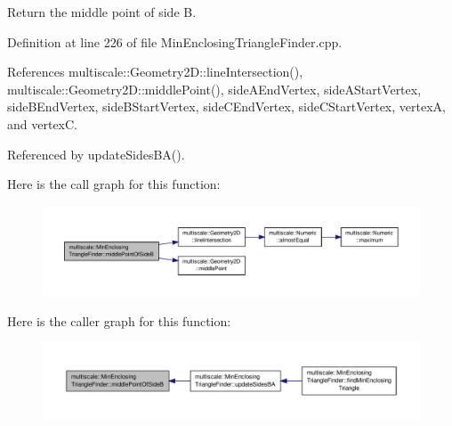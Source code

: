Return the middle point of side B. 



Definition at line 226 of file Min\-Enclosing\-Triangle\-Finder.\-cpp.



References multiscale\-::\-Geometry2\-D\-::line\-Intersection(), multiscale\-::\-Geometry2\-D\-::middle\-Point(), side\-A\-End\-Vertex, side\-A\-Start\-Vertex, side\-B\-End\-Vertex, side\-B\-Start\-Vertex, side\-C\-End\-Vertex, side\-C\-Start\-Vertex, vertex\-A, and vertex\-C.



Referenced by update\-Sides\-B\-A().



Here is the call graph for this function\-:\nopagebreak
\begin{figure}[H]
\begin{center}
\leavevmode
\includegraphics[width=350pt]{classmultiscale_1_1MinEnclosingTriangleFinder_a664bee3e51e007b97fa21a92830f9066_cgraph}
\end{center}
\end{figure}




Here is the caller graph for this function\-:\nopagebreak
\begin{figure}[H]
\begin{center}
\leavevmode
\includegraphics[width=350pt]{classmultiscale_1_1MinEnclosingTriangleFinder_a664bee3e51e007b97fa21a92830f9066_icgraph}
\end{center}
\end{figure}


